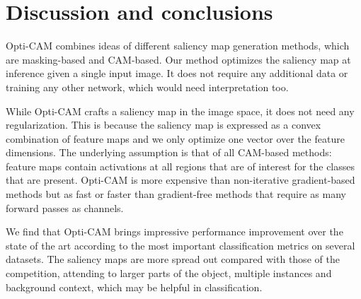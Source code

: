 \section{Discussion and conclusions}
\label{sec:conclusion}

Opti-CAM combines ideas of different saliency map generation methods, which are masking-based and CAM-based. Our method optimizes the saliency map at inference given a single input image. It does not require any additional data or training any other network, which would need interpretation too.

While Opti-CAM crafts a saliency map in the image space, it does not need any regularization. This is because the saliency map is expressed as a convex combination of feature maps and we only optimize one vector over the feature dimensions. The underlying assumption is that of all CAM-based methods: feature maps contain activations at all regions that are of interest for the classes that are present. Opti-CAM is more expensive than non-iterative gradient-based methods but as fast or faster than gradient-free methods that require as many forward passes as channels.

We find that Opti-CAM brings impressive performance improvement over the state of the art according to the most important classification metrics on several datasets. The saliency maps are more spread out compared with those of the competition, attending to larger parts of the object, multiple instances and background context, which may be helpful in classification.


